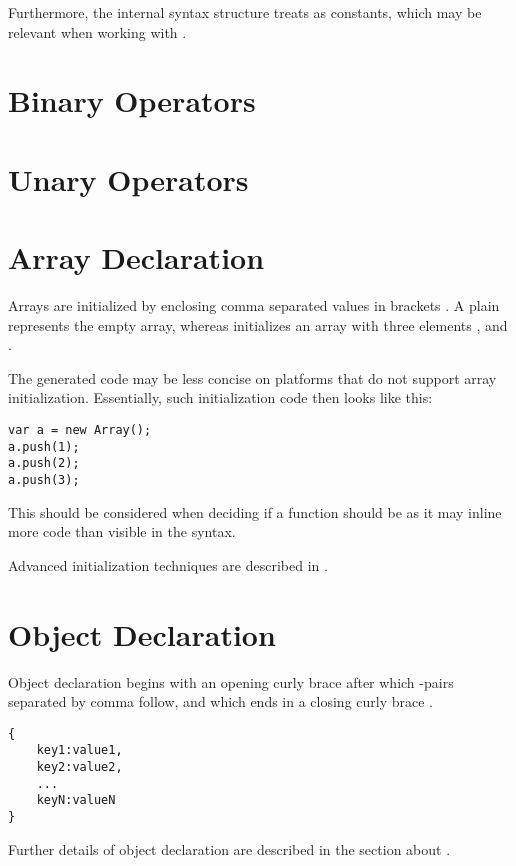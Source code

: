 Furthermore, the internal syntax structure treats  as constants, which may be relevant when working with .


\section{Binary Operators}
\label{expression-binops}

\section{Unary Operators}
\label{expression-unops}

\section{Array Declaration}
\label{expression-array-declaration}

Arrays are initialized by enclosing comma \expr{,} separated values in brackets \expr{[]}. A plain \expr{[]} represents the empty array, whereas \expr{[1, 2, 3]} initializes an array with three elements ,  and .

The generated code may be less concise on platforms that do not support array initialization. Essentially, such initialization code then looks like this:

\begin{lstlisting}
var a = new Array();
a.push(1);
a.push(2);
a.push(3);
\end{lstlisting}
This should be considered when deciding if a function should be  as it may inline more code than visible in the syntax.

Advanced initialization techniques are described in .


\section{Object Declaration}
\label{expression-object-declaration}

Object declaration begins with an opening curly brace \expr{\{} after which -pairs separated by comma \expr{,} follow, and which ends in a closing curly brace \expr{\}}.

\begin{lstlisting}
{
	key1:value1,
	key2:value2,
	...
	keyN:valueN
}
\end{lstlisting}
Further details of object declaration are described in the section about .



